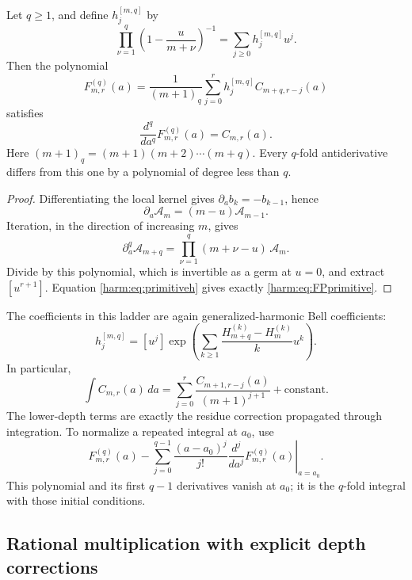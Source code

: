 \begin{theorem}
\label{harm:thm:FPprimitives}
Let \(q\geq1\), and define \(h_j^{[m,q]}\) by
\begin{equation}\label{harm:eq:primitiveh}
 \prod_{\nu=1}^{q}
       \left(1-\frac{u}{m+\nu}\right)^{-1}
       =\sum_{j\geq0}h_j^{[m,q]}u^j.
\end{equation}
Then the polynomial
\begin{equation}\label{harm:eq:FPprimitive}
 F_{m,r}^{(q)}(a)=
 \frac{1}{(m+1)_q}
 \sum_{j=0}^{r}h_j^{[m,q]}C_{m+q,r-j}(a)
\end{equation}
satisfies
\[
 \frac{d^q}{da^q}F_{m,r}^{(q)}(a)=C_{m,r}(a).
\]
Here \((m+1)_q=(m+1)(m+2)\cdots(m+q)\).
Every \(q\)-fold antiderivative differs from this one by a polynomial
of degree less than \(q\).
\end{theorem}

\begin{proof}
Differentiating the local kernel gives
\(\partial_a b_k=-b_{k-1}\), hence
\[
 \partial_a\mathcal A_m=(m-u)\mathcal A_{m-1}.
\]
Iteration, in the direction of increasing \(m\), gives
\[
 \partial_a^q\mathcal A_{m+q}
       =\prod_{\nu=1}^{q}(m+\nu-u)\,\mathcal A_m.
\]
Divide by this polynomial, which is invertible as a germ at \(u=0\),
and extract \([u^{r+1}]\). Equation
\eqref{harm:eq:primitiveh} gives exactly
\eqref{harm:eq:FPprimitive}.
\end{proof}

The coefficients in this ladder are again generalized-harmonic
Bell coefficients:
\[
 h_j^{[m,q]}=[u^j]\exp\left(
   \sum_{k\geq1}\frac{H_{m+q}^{(k)}-H_m^{(k)}}{k}u^k
                              \right).
\]
In particular,
\begin{equation}\label{harm:eq:firstFPprimitive}
 \int C_{m,r}(a)\,da
 =\sum_{j=0}^{r}\frac{C_{m+1,r-j}(a)}{(m+1)^{j+1}}
   +\text{constant}.
\end{equation}
The lower-depth terms are exactly the residue correction propagated
through integration. To normalize a repeated integral at \(a_0\), use
\[
 F_{m,r}^{(q)}(a)
 -\sum_{j=0}^{q-1}
       \frac{(a-a_0)^j}{j!}
       \left.\frac{d^j}{da^j}F_{m,r}^{(q)}(a)\right|_{a=a_0}.
\]
This polynomial and its first \(q-1\) derivatives vanish at \(a_0\);
it is the \(q\)-fold integral with those initial conditions.

\subsection{Rational multiplication with explicit depth corrections}
\label{harm:subsec:multiplication}

